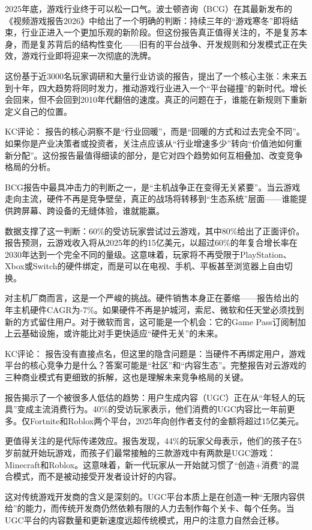 \documentclass[11pt]{ctexart}
\begin{document}
2025年底，游戏行业终于可以松一口气。波士顿咨询（BCG）在其最新发布的《视频游戏报告2026》中给出了一个明确的判断：持续三年的“游戏寒冬”即将结束，行业正进入一个更加乐观的新阶段。但这份报告真正值得关注的，不是复苏本身，而是复苏背后的结构性变化——旧有的平台战争、开发规则和分发模式正在失效，游戏行业即将迎来一次彻底的洗牌。

这份基于近3000名玩家调研和大量行业访谈的报告，提出了一个核心主张：未来五到十年，四大趋势将同时发力，推动游戏行业进入一个“平台碰撞”的新时代。增长会回来，但不会回到2010年代翻倍的速度。真正的问题在于，谁能在新规则下重新定义自己的位置。

KC评论： 报告的核心洞察不是“行业回暖”，而是“回暖的方式和过去完全不同”。如果你是产业决策者或投资者，关注点应该从“行业增速多少”转向“价值池如何重新分配”。这份报告最值得细读的部分，是它对四个趋势如何互相叠加、改变竞争格局的分析。

BCG报告中最具冲击力的判断之一，是“主机战争正在变得无关紧要”。当云游戏走向主流，硬件不再是竞争壁垒，真正的战场将转移到“生态系统”层面——谁能提供跨屏幕、跨设备的无缝体验，谁就能赢。

数据支撑了这一判断：60\%的受访玩家尝试过云游戏，其中80\%给出了正面评价。报告预测，云游戏收入将从2025年的约15亿美元，以超过60\%的年复合增长率在2030年达到一个完全不同的量级。这意味着，玩家将不再受限于PlayStation、Xbox或Switch的硬件绑定，而是可以在电视、手机、平板甚至浏览器上自由切换。

对主机厂商而言，这是一个严峻的挑战。硬件销售本身正在萎缩——报告给出的 年主机硬件CAGR为-7\%。如果硬件不再是护城河，索尼、微软和任天堂必须找到新的方式留住用户。对于微软而言，这可能是一个机会：它的Game Pass订阅制加上云基础设施，或许能比对手更快适应“硬件无关”的未来。

KC评论： 报告没有直接点名，但这里的隐含问题是：当硬件不再绑定用户，游戏平台的核心竞争力是什么？答案可能是“社区”和“内容生态”。完整报告对云游戏的三种商业模式有更细致的拆解，这也是理解未来竞争格局的关键。

报告揭示了一个被很多人低估的趋势：用户生成内容（UGC）正在从“年轻人的玩具”变成主流消费行为。40\%的受访玩家表示，他们消费的UGC内容比一年前更多。仅Fortnite和Roblox两个平台，2025年向创作者支付的金额将超过15亿美元。

更值得关注的是代际传递效应。报告发现，44\%的玩家父母表示，他们的孩子在5岁前就开始玩游戏，而孩子们最常接触的三款游戏中有两款是UGC游戏：Minecraft和Roblox。这意味着，新一代玩家从一开始就习惯了“创造+消费”的混合模式，而不是被动接受开发者设计好的内容。

这对传统游戏开发商的含义是深刻的。UGC平台本质上是在创造一种“无限内容供给”的能力，而传统开发商仍然依赖有限的人力去制作每个关卡、每个任务。当UGC平台的内容数量和更新速度远超传统模式，用户的注意力自然会迁移。
\end{document}
